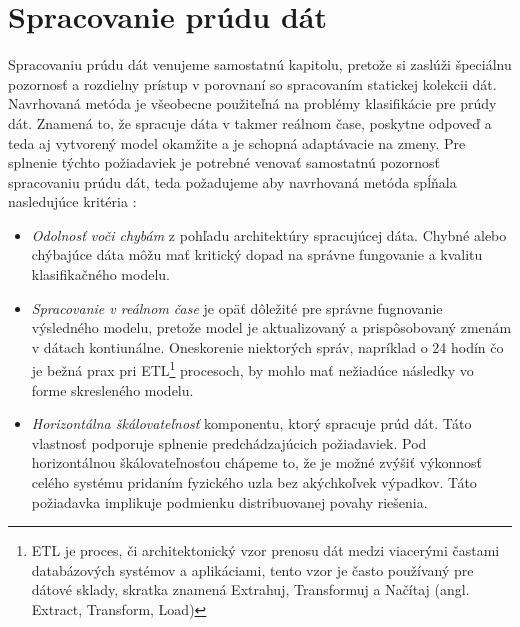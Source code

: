 \section{Spracovanie prúdu dát}
\label{method-spracovanie-prudu-dat}

Spracovaniu prúdu dát venujeme samostatnú kapitolu, pretože si zaslúži špeciálnu pozornosť a rozdielny prístup v porovnaní so spracovaním statickej kolekcii dát. Navrhovaná metóda je všeobecne použiteľná na problémy klasifikácie pre prúdy dát. Znamená to, že spracuje dáta v takmer reálnom čase, poskytne odpoveď a teda aj vytvorený model okamžite a je schopná adaptávacie na zmeny. Pre splnenie týchto požiadaviek je potrebné venovať samostatnú pozornosť spracovaniu prúdu dát, teda požadujeme aby navrhovaná metóda spĺňala nasledujúce kritéria \citep{cimerman2015prudy}:
\begin{itemize}
	\item \textit{Odolnosť voči chybám} z pohľadu architektúry spracujúcej dáta. Chybné alebo chýbajúce dáta môžu mať kritický dopad na správne fungovanie a kvalitu klasifikačného modelu.
	\item \textit{Spracovanie v reálnom čase} je opäť dôležité pre správne fugnovanie výsledného modelu, pretože model je aktualizovaný a prispôsobovaný zmenám v dátach kontiunálne. Oneskorenie niektorých správ, napríklad o 24 hodín čo je bežná prax pri ETL\footnote{ETL je proces, či architektonický vzor prenosu dát medzi viacerými častami databázových systémov  a aplikáciami, tento vzor je často používaný pre dátové sklady, skratka znamená Extrahuj, Transformuj a Načítaj (angl. Extract, Transform, Load)} procesoch, by mohlo mať nežiadúce následky vo forme skresleného modelu.
	\item \textit{Horizontálna škálovateľnosť} komponentu, ktorý spracuje prúd dát. Táto vlastnosť podporuje splnenie predchádzajúcich požiadaviek. Pod horizontálnou škálovateľnosťou chápeme to, že je možné zvýšiť výkonnosť celého systému pridaním fyzického uzla bez akýchkoľvek výpadkov. Táto požiadavka implikuje podmienku distribuovanej povahy riešenia.
\end{itemize}

